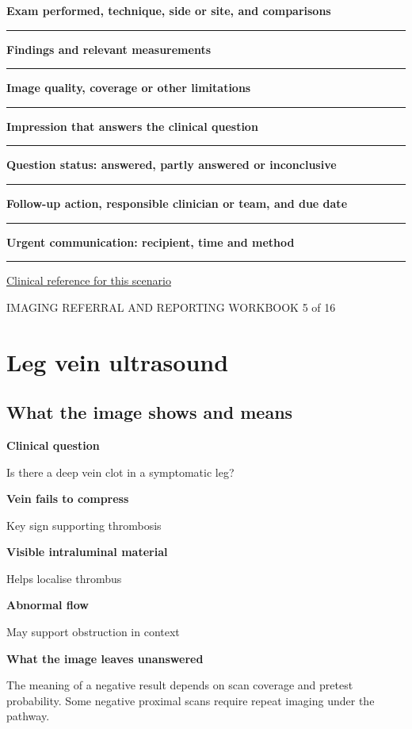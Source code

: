 \documentclass[11pt,a4paper]{article}
\newcommand{\record}[1]{\textbf{#1}\par\vspace{0.55\baselineskip}\hrule\vspace{0.35\baselineskip}}
\begin{document}
\record{Exam performed, technique, side or site, and comparisons}

\record{Findings and relevant measurements}

\record{Image quality, coverage or other limitations}

\record{Impression that answers the clinical question}

\record{Question status: answered, partly answered or inconclusive}

\record{Follow-up action, responsible clinician or team, and due date}

\record{Urgent communication: recipient, time and method}

\small\href{https://www.nice.org.uk/guidance/ng158/chapter/Recommendations}{Clinical reference for this scenario}

\normalsize

\newpage

{\small IMAGING REFERRAL AND REPORTING WORKBOOK \hfill 5 of 16}

\section*{Leg vein ultrasound}

\subsection*{What the image shows and means}

\textbf{Clinical question}\par Is there a deep vein clot in a symptomatic leg?\par

\textbf{Vein fails to compress}\par Key sign supporting thrombosis\par

\textbf{Visible intraluminal material}\par Helps localise thrombus\par

\textbf{Abnormal flow}\par May support obstruction in context\par

\textbf{What the image leaves unanswered}\par The meaning of a negative result depends on scan coverage and pretest probability. Some negative proximal scans require repeat imaging under the pathway.\par
\end{document}
